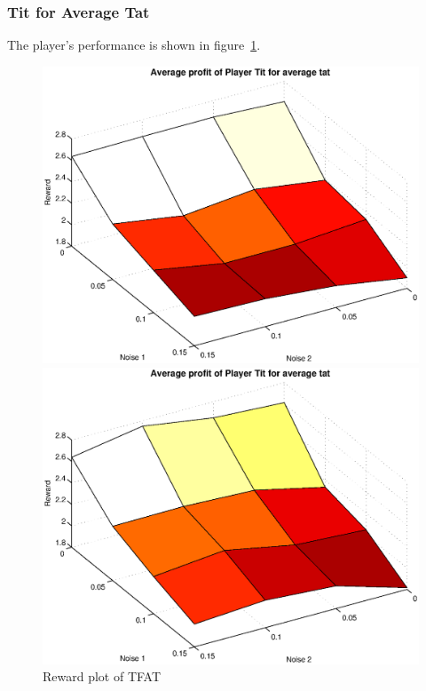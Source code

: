 \subsubsection{Tit for Average Tat}
The player's performance is shown in figure~\ref{pic player tfat}.\\
\begin{figure}[h]
	\caption{Reward plot of TFAT}
	\label{pic player tfat}
\begin{minipage}[hbt]{0.65\textwidth}
	\centering
	\includegraphics[width=\textwidth]{pics/simulation1/Reward_vs_Noise_of_Player_Tit_for_average_tat}
\end{minipage}
\hfill
\begin{minipage}[hbt]{0.3\textwidth}
	\centering
	\includegraphics[width=\textwidth]{pics/simulation2/Reward_vs_Noise_of_Player_Tit_for_average_tat}
\end{minipage}

\end{figure}

